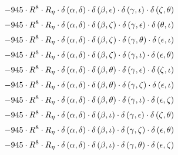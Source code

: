 \begin{subequations}
\begin{gather}
 \\[0.2em] \notag 		 - 945 \cdot R^{8} \cdot R_{\eta{}} \cdot \delta{}\left(\alpha{}, \delta{}\right) \cdot \delta{}\left(\beta{}, \epsilon{}\right) \cdot \delta{}\left(\gamma{}, \iota{}\right) \cdot \delta{}\left(\zeta{}, \theta{}\right) 
 \\[0.2em] \notag 		 - 945 \cdot R^{8} \cdot R_{\eta{}} \cdot \delta{}\left(\alpha{}, \delta{}\right) \cdot \delta{}\left(\beta{}, \zeta{}\right) \cdot \delta{}\left(\gamma{}, \epsilon{}\right) \cdot \delta{}\left(\theta{}, \iota{}\right) 
 \\[0.2em] \notag 		 - 945 \cdot R^{8} \cdot R_{\eta{}} \cdot \delta{}\left(\alpha{}, \delta{}\right) \cdot \delta{}\left(\beta{}, \zeta{}\right) \cdot \delta{}\left(\gamma{}, \theta{}\right) \cdot \delta{}\left(\epsilon{}, \iota{}\right) 
 \\[0.2em] \notag 		 - 945 \cdot R^{8} \cdot R_{\eta{}} \cdot \delta{}\left(\alpha{}, \delta{}\right) \cdot \delta{}\left(\beta{}, \zeta{}\right) \cdot \delta{}\left(\gamma{}, \iota{}\right) \cdot \delta{}\left(\epsilon{}, \theta{}\right) 
 \\[0.2em] \notag 		 - 945 \cdot R^{8} \cdot R_{\eta{}} \cdot \delta{}\left(\alpha{}, \delta{}\right) \cdot \delta{}\left(\beta{}, \theta{}\right) \cdot \delta{}\left(\gamma{}, \epsilon{}\right) \cdot \delta{}\left(\zeta{}, \iota{}\right) 
 \\[0.2em] \notag 		 - 945 \cdot R^{8} \cdot R_{\eta{}} \cdot \delta{}\left(\alpha{}, \delta{}\right) \cdot \delta{}\left(\beta{}, \theta{}\right) \cdot \delta{}\left(\gamma{}, \zeta{}\right) \cdot \delta{}\left(\epsilon{}, \iota{}\right) 
 \\[0.2em] \notag 		 - 945 \cdot R^{8} \cdot R_{\eta{}} \cdot \delta{}\left(\alpha{}, \delta{}\right) \cdot \delta{}\left(\beta{}, \theta{}\right) \cdot \delta{}\left(\gamma{}, \iota{}\right) \cdot \delta{}\left(\epsilon{}, \zeta{}\right) 
 \\[0.2em] \notag 		 - 945 \cdot R^{8} \cdot R_{\eta{}} \cdot \delta{}\left(\alpha{}, \delta{}\right) \cdot \delta{}\left(\beta{}, \iota{}\right) \cdot \delta{}\left(\gamma{}, \epsilon{}\right) \cdot \delta{}\left(\zeta{}, \theta{}\right) 
 \\[0.2em] \notag 		 - 945 \cdot R^{8} \cdot R_{\eta{}} \cdot \delta{}\left(\alpha{}, \delta{}\right) \cdot \delta{}\left(\beta{}, \iota{}\right) \cdot \delta{}\left(\gamma{}, \zeta{}\right) \cdot \delta{}\left(\epsilon{}, \theta{}\right) 
 \\[0.2em] \notag 		 - 945 \cdot R^{8} \cdot R_{\eta{}} \cdot \delta{}\left(\alpha{}, \delta{}\right) \cdot \delta{}\left(\beta{}, \iota{}\right) \cdot \delta{}\left(\gamma{}, \theta{}\right) \cdot \delta{}\left(\epsilon{}, \zeta{}\right) 

\end{gather}
\end{subequations}
